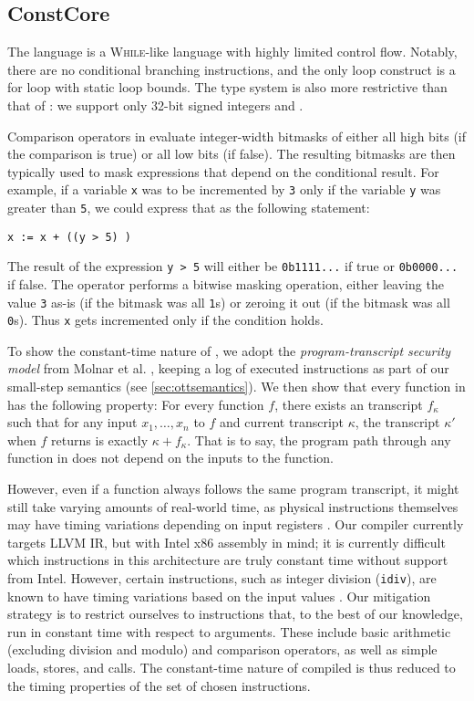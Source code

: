 \subsection{ConstCore}

The \ccore language is a \textsc{While}-like language \cite{ref:while} with highly limited
control flow. Notably, there are no conditional branching instructions, and the
only loop construct is a for loop with static loop bounds. The type system
is also more restrictive than that of \constc: we support only 32-bit
signed integers and \bytearrays.

Comparison operators in \ccore evaluate integer-width bitmasks of either all
high bits (if the comparison is true) or all low bits (if false). The resulting
bitmasks are then typically used to mask expressions that depend on the conditional
result. For example, if a variable \texttt{x} was to be incremented by \texttt{3}
only if the variable \texttt{y} was greater than \texttt{5}, we could express that
as the following statement:
\begin{center} \texttt{x := x + ((y > 5) )} \end{center}
The result of the expression \texttt{y > 5} will either be \texttt{0b1111...} if true
or \texttt{0b0000...} if false. The \band operator performs a bitwise masking operation,
either leaving the value \texttt{3} as-is (if the bitmask was all \texttt{1}s) or zeroing
it out (if the bitmask was all \texttt{0}s). Thus \texttt{x} gets incremented only
if the condition holds.

To show the constant-time nature of \ccore, we adopt the
\emph{program-transcript security model} from Molnar et al. \cite{molnar2005},
keeping a log of executed instructions as part of our small-step
semantics (see \autoref{sec:ottsemantics}). We then show that every function in
\ccore has the following property: For every function $f$, there exists an
transcript $f_\kappa$ such that for any input $x_1,\dots,x_n$ to $f$ and
current transcript $\kappa$, the transcript $\kappa'$ when $f$ returns is
exactly $\kappa + f_\kappa$. That is to say, the program path through any
function in \ccore does not depend on the inputs to the function.

However, even if a function always follows the same program transcript,
it might still take varying amounts of real-world time, as physical instructions
themselves may have timing variations depending on input registers \cite{kaufmann2016constant}. Our compiler
currently targets LLVM IR, but with Intel x86 assembly in mind; it is currently difficult
which instructions in this architecture are truly constant time without support from Intel. However, certain
instructions, such as integer division (\texttt{idiv}), are known to have timing variations
based on the input values \cite{intel2016manual}. Our
mitigation strategy is to restrict ourselves to instructions that, to the best of our knowledge,
run in constant time with respect to arguments.
These include basic arithmetic (excluding division and modulo) and comparison operators, as well as
simple loads, stores, and calls. The constant-time nature of compiled
\ccore is thus reduced to the timing properties of the set of chosen instructions.

